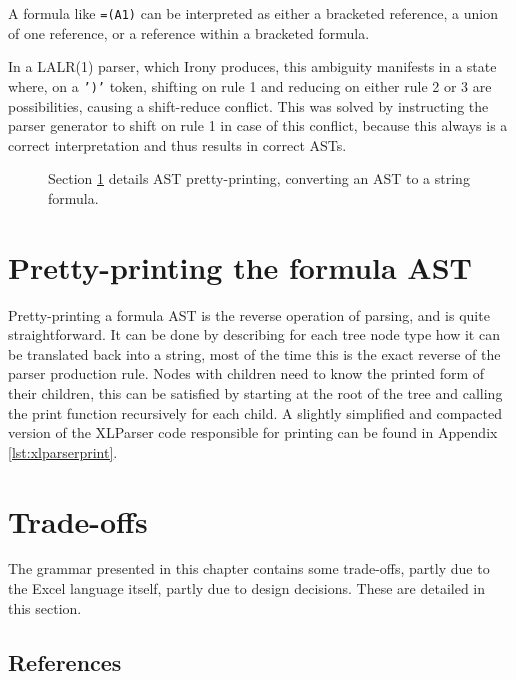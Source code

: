 A formula like \texttt{=(A1)} can be interpreted as either a bracketed reference, a union of one reference, or a reference within a bracketed formula.

In a LALR(1) parser, which Irony produces, this ambiguity manifests in a state where, on a \texttt{')'} token, shifting on rule 1 and reducing on either rule 2 or 3 are possibilities, causing a shift-reduce conflict.
This was solved by instructing the parser generator to shift on rule 1 in case of this conflict, because this always is a correct interpretation and thus results in correct ASTs.

\newpage

\noindent
\begin{figure}[h!]
	\hspace*{0.003\textwidth}
	
	\caption{Section \ref{sec:printing} details AST pretty-printing, converting an AST to a string formula.}
\end{figure}

\section{Pretty-printing the formula AST}
\label{sec:printing}

Pretty-printing a formula AST is the reverse operation of parsing, and is quite straightforward.
It can be done by describing for each tree node type how it can be translated back into a string, most of the time this is the exact reverse of the parser production rule.
Nodes with children need to know the printed form of their children, this can be satisfied by starting at the root of the tree and calling the print function recursively for each child.
A slightly simplified and compacted version of the XLParser code responsible for printing can be found in Appendix \ref{lst:xlparserprint}.

\section{Trade-offs}

The grammar presented in this chapter contains some trade-offs, partly due to the Excel language itself, partly due to design decisions.
These are detailed in this section.

\subsection{References}
\label{tradeoff:references}

